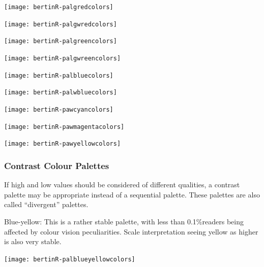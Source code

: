 \documentclass[nogin, dvips,12pt,a4paper,twoside]{amsart}
\begin{document}
\texttt{[image: bertinR-palgredcolors]}


\texttt{[image: bertinR-palgwredcolors]}

\clearpage

\texttt{[image: bertinR-palgreencolors]}


\texttt{[image: bertinR-palgwreencolors]}

\clearpage

\texttt{[image: bertinR-palbluecolors]}


\texttt{[image: bertinR-palwbluecolors]}


\clearpage
\texttt{[image: bertinR-pawcyancolors]}


\texttt{[image: bertinR-pawmagentacolors]}


\texttt{[image: bertinR-pawyellowcolors]}


\clearpage
\subsubsection{Contrast Colour Palettes} If high and low values should be considered of different qualities, a contrast palette may be appropriate instead of a sequential palette. These palettes are also called ``divergent'' palettes.


Blue-yellow: This is a rather stable palette, with less than 0.1\%readers being affected by colour vision peculiarities. Scale interpretation seeing yellow as higher is also very stable.

\texttt{[image: bertinR-palblueyellowcolors]}
%

\end{document}

